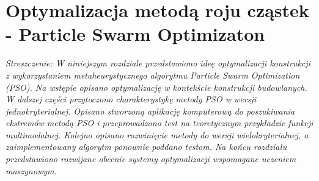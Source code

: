 \chapter{Optymalizacja metodą roju cząstek - Particle Swarm Optimizaton} \label{sect:PSO_chapter}

\textit{Streszczenie: W niniejszym rozdziale przedstawiono ideę optymalizacji konstrukcji z wykorzystaniem metaheurystycznego algorytmu Particle Swarm Optimization (PSO). Na wstępie opisano optymalizację w kontekście konstrukcji budowlanych. W dalszej części przytoczono charakterystykę metody PSO w wersji jednokryterialnej. Opisano stworzoną aplikację komputerową do poszukiwania ekstremów metodą PSO i przeprowadzono test na teoretycznym przykładzie funkcji multimodalnej. Kolejno opisano rozwinięcie metody do wersji wielokryterialnej, a zaimplementowany algorytm ponownie poddano testom. Na końcu rozdziału przedstawiono rozwijane obecnie systemy optymalizacji wspomagane uczeniem maszynowym.}

